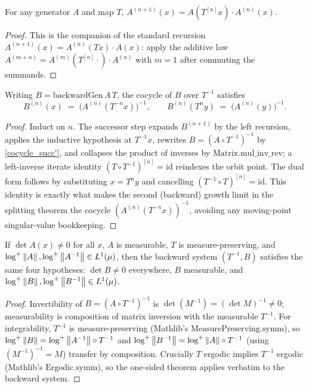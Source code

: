 \begin{lemma}\label{cocycle_succ'}
  \leanok
  For any generator \(A\) and map \(T\), \(A^{(n+1)}(x) = A(T^{[n]}x)\cdot A^{(n)}(x)\).
\end{lemma}
\begin{proof}\leanok
  This is the companion of the standard recursion \(A^{(n+1)}(x) = A^{(n)}(Tx)\cdot A(x)\): apply the additive law \(A^{(m+n)} = A^{(m)}(T^{[n]}\cdot)\cdot A^{(n)}\) with \(m = 1\) after commuting the summands.
\end{proof}

\begin{lemma}\label{cocycle_backwardGen}
  \leanok
  Writing \(B = \mathrm{backwardGen}\,A\,T\), the cocycle of \(B\) over \(T^{-1}\) satisfies
  \[
    B^{(n)}(x) \;=\; \bigl(A^{(n)}(T^{-n}x)\bigr)^{-1}, \qquad B^{(n)}(T^{n}y) \;=\; \bigl(A^{(n)}(y)\bigr)^{-1}.
  \]
\end{lemma}
\begin{proof}\leanok
  Induct on \(n\). The successor step expands \(B^{(n+1)}\) by the left recursion, applies the inductive hypothesis at \(T^{-1}x\), rewrites \(B = (A\circ T^{-1})^{-1}\) by \cref{cocycle_succ'}, and collapses the product of inverses by \(\mathrm{Matrix.mul\_inv\_rev}\); a left-inverse iterate identity \((T\circ T^{-1})^{[n]} = \mathrm{id}\) reindexes the orbit point. The dual form follows by substituting \(x = T^{n}y\) and cancelling \((T^{-1}\circ T)^{[n]} = \mathrm{id}\). This identity is exactly what makes the second (backward) growth limit in the splitting theorem the cocycle \((A^{(n)}(T^{-n}x))^{-1}\), avoiding any moving-point singular-value bookkeeping.
\end{proof}

\begin{proposition}\label{backwardData_of}
  \leanok
  If \(\det A(x) \neq 0\) for all \(x\), \(A\) is measurable, \(T\) is measure-preserving, and \(\log^+\left\lVert A \right\rVert, \log^+\left\lVert A^{-1} \right\rVert \in L^1(\mu)\), then the backward system \((T^{-1}, B)\) satisfies the same four hypotheses: \(\det B \neq 0\) everywhere, \(B\) measurable, and \(\log^+\left\lVert B \right\rVert, \log^+\left\lVert B^{-1} \right\rVert \in L^1(\mu)\).
\end{proposition}
\begin{proof}\leanok
  Invertibility of \(B = (A\circ T^{-1})^{-1}\) is \(\det(M^{-1}) = (\det M)^{-1} \neq 0\); measurability is composition of matrix inversion with the measurable \(T^{-1}\). For integrability, \(T^{-1}\) is measure-preserving (Mathlib's \(\mathrm{MeasurePreserving.symm}\)), so \(\log^+\left\lVert B \right\rVert = \log^+\left\lVert A^{-1} \right\rVert\circ T^{-1}\) and \(\log^+\left\lVert B^{-1} \right\rVert = \log^+\left\lVert A \right\rVert\circ T^{-1}\) (using \((M^{-1})^{-1} = M\)) transfer by composition. Crucially \(T\) ergodic implies \(T^{-1}\) ergodic (Mathlib's \(\mathrm{Ergodic.symm}\)), so the one-sided theorem applies verbatim to the backward system.
\end{proof}

